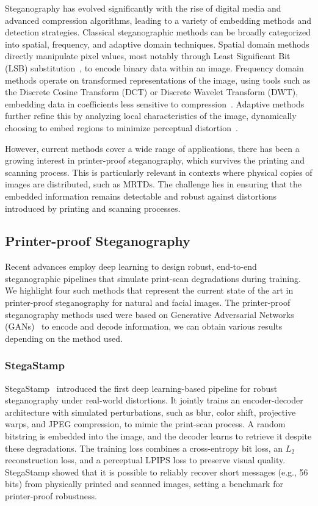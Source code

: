 Steganography has evolved significantly with the rise of digital media and advanced compression algorithms, leading to a variety of embedding methods and detection strategies. Classical steganographic methods can be broadly categorized into spatial, frequency, and adaptive domain techniques. Spatial domain methods directly manipulate pixel values, most notably through Least Significant Bit (LSB) substitution~\cite{steganography2017}, to encode binary data within an image. Frequency domain methods operate on transformed representations of the image, using tools such as the Discrete Cosine Transform (DCT) or Discrete Wavelet Transform (DWT), embedding data in coefficients less sensitive to compression~\cite{steganography2016survey}. Adaptive methods further refine this by analyzing local characteristics of the image, dynamically choosing to embed regions to minimize perceptual distortion~\cite{steganography2018adaptive}.

However, current methods cover a wide range of applications, there has been a growing interest in printer-proof steganography, which survives the printing and scanning process. This is particularly relevant in contexts where physical copies of images are distributed, such as MRTDs. The challenge lies in ensuring that the embedded information remains detectable and robust against distortions introduced by printing and scanning processes.

\subsection{Printer-proof Steganography}
Recent advances employ deep learning to design robust, end-to-end steganographic pipelines that simulate print-scan degradations during training. We highlight four such methods that represent the current state of the art in printer-proof steganography for natural and facial images. The printer-proof steganography methods used were based on Generative Adversarial Networks (GANs)~\cite{gans2018} to encode and decode information, we can obtain various results depending on the method used.

\subsubsection{StegaStamp}
StegaStamp~\cite{stegastamp2020} introduced the first deep learning-based pipeline for robust steganography under real-world distortions. It jointly trains an encoder-decoder architecture with simulated perturbations, such as blur, color shift, projective warps, and JPEG compression, to mimic the print-scan process. A random bitstring is embedded into the image, and the decoder learns to retrieve it despite these degradations. The training loss combines a cross-entropy bit loss, an $L_2$ reconstruction loss, and a perceptual LPIPS loss to preserve visual quality. StegaStamp showed that it is possible to reliably recover short messages (e.g., 56 bits) from physically printed and scanned images, setting a benchmark for printer-proof robustness.

